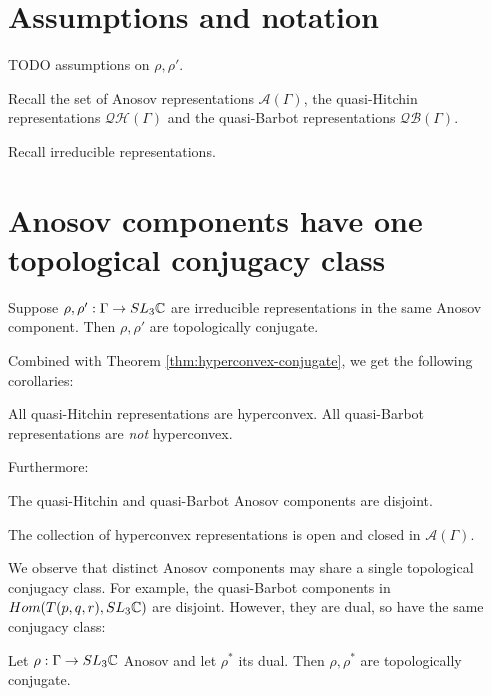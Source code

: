 \section{Assumptions and notation}
TODO assumptions on $\rho,\rho'$.

Recall the set of Anosov representations $\mathcal{A}(\Gamma)$,
the quasi-Hitchin representations $\mathcal{QH}(\Gamma)$
and the quasi-Barbot representations $\mathcal{QB}(\Gamma)$.

Recall irreducible representations.

\section{Anosov components have one topological conjugacy class}

\begin{theorem}\label{thm:component}
    Suppose $\rho,\rho':\Gamma \rightarrow SL_3\mathbb{C}$ are irreducible representations
    in the same Anosov component.
    Then $\rho, \rho'$ are topologically conjugate.
\end{theorem}

Combined with Theorem \ref{thm:hyperconvex-conjugate}, we get the following corollaries:
\begin{corollary}
    All quasi-Hitchin representations are hyperconvex.
    All quasi-Barbot representations are \emph{not} hyperconvex.
\end{corollary}
Furthermore:
\begin{corollary}
    The quasi-Hitchin and quasi-Barbot Anosov components are disjoint.
\end{corollary}

\begin{corollary}
    The collection of hyperconvex representations is open and closed in $\mathcal{A}(\Gamma)$.
\end{corollary}

We observe that distinct Anosov components may share a single topological conjugacy class.
For example, the quasi-Barbot components in $Hom(T(p,q,r),SL_3\mathbb{C})$ are disjoint.
However, they are dual, so have the same conjugacy class:
\begin{proposition}
    Let $\rho:\Gamma \rightarrow SL_3\mathbb{C}$ Anosov and let $\rho^*$ its dual.
    Then $\rho,\rho^*$ are topologically conjugate.
\end{proposition}

